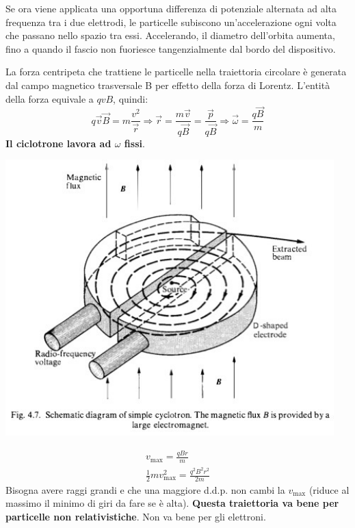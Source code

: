 \documentclass[a4paper,11pt,twoside,openany]{book}
\theoremstyle{definition}
\theoremstyle{plain}
\theoremstyle{plain}
\theoremstyle{definition}
\begin{document}
Se ora viene applicata una opportuna differenza di potenziale alternata ad alta frequenza tra i due elettrodi, le particelle subiscono un'accelerazione ogni volta che passano nello spazio tra essi. Accelerando, il diametro dell'orbita aumenta, fino a quando il fascio non fuoriesce tangenzialmente dal bordo del dispositivo.

La forza centripeta che trattiene le particelle nella traiettoria circolare è generata dal campo magnetico trasversale B per effetto della forza di Lorentz. L'entità della forza equivale a $qvB$, quindi:
$$q\vec v\vec B=m\frac{v^2}{\vec r}\Longrightarrow \vec r=\frac{m\vec v}{q\vec B}=\frac{\vec p}{q\vec B} \Longrightarrow \vec\omega =\frac{q\vec B}{m}$$
\textbf{Il ciclotrone lavora ad $\omega $ fissi}.

\begin{center}
\includegraphics[width=5in]{immagini/ciclotron.jpg} %
\end{center}

\begin{equation}\begin{split}
v_{\max}=\frac{qBr}{m}\\
\frac{1}{2}mv^2_{\max}=\frac{q^2B^2r^2}{2m}
\end{split}\end{equation}
Bisogna avere raggi grandi e che una maggiore d.d.p. non cambi la $v_{\max}$ (riduce al massimo il minimo di giri da fare se è alta). \textbf{Questa traiettoria va bene per particelle non relativistiche}. Non va bene per gli elettroni.
\end{document}
